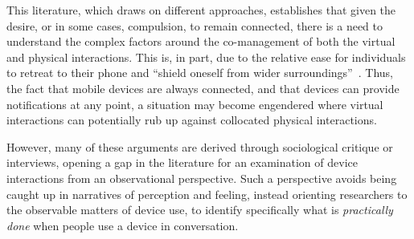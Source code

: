 This literature, which draws on different approaches, establishes that given the desire, or in some cases, compulsion, to remain connected, there is a need to understand the complex factors around the co-management of both the virtual and physical interactions.
This is, in part, due to the relative ease for individuals to retreat to their phone and ``shield oneself from wider surroundings''~\citep[p. 4]{Geser2006}.
Thus, the fact that mobile devices are always connected, and that devices can provide notifications at any point, a situation may become engendered where virtual interactions can potentially rub up against collocated physical interactions.


However, many of these arguments are derived through sociological critique or interviews, opening a gap in the literature for an examination of device interactions from an observational perspective.
Such a perspective avoids being caught up in narratives of perception and feeling, instead orienting researchers to the observable matters of device use, to identify specifically what is \textit{practically done} when people use a device in conversation.






